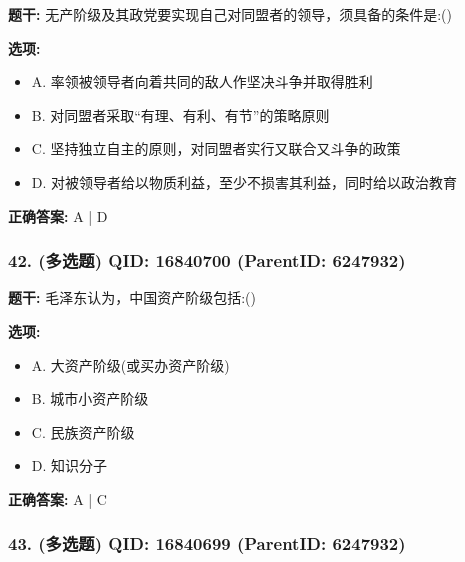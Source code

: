 \documentclass[12pt,UTF8]{ctexart}
\begin{document}
\textbf{题干:}
无产阶级及其政党要实现自己对同盟者的领导，须具备的条件是:()



\textbf{选项:}
\begin{itemize}[leftmargin=*]

  \item A. 率领被领导者向着共同的敌人作坚决斗争并取得胜利

  \item B. 对同盟者采取“有理、有利、有节”的策略原则

  \item C. 坚持独立自主的原则，对同盟者实行又联合又斗争的政策

  \item D. 对被领导者给以物质利益，至少不损害其利益，同时给以政治教育

\end{itemize}

\textbf{正确答案:}
A | D

\vspace{0.3em}\hrulefill\vspace{0.7em}

\subsubsection*{42. (多选题) \small QID: 16840700 (ParentID: 6247932)}

\textbf{题干:}
毛泽东认为，中国资产阶级包括:()



\textbf{选项:}
\begin{itemize}[leftmargin=*]

  \item A. 大资产阶级(或买办资产阶级)

  \item B. 城市小资产阶级

  \item C. 民族资产阶级

  \item D. 知识分子

\end{itemize}

\textbf{正确答案:}
A | C

\vspace{0.3em}\hrulefill\vspace{0.7em}

\subsubsection*{43. (多选题) \small QID: 16840699 (ParentID: 6247932)}
\end{document}
